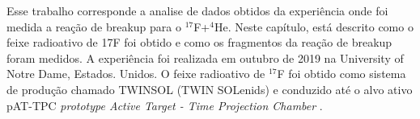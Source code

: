 \documentclass[a4paper,12pt,oneside]{book}
\begin{document}

\par Esse trabalho corresponde a analise de dados obtidos da experiência onde foi medida a reação de breakup para o $^{17}$F+$^{4}$He. Neste capítulo, está descrito como o feixe radioativo de 17F foi obtido e como os fragmentos da reação de breakup foram medidos. A experiência foi realizada em outubro de 2019 na University of Notre Dame, Estados. Unidos. O feixe radioativo de $^{17}$F foi obtido como sistema de produção chamado TWINSOL (TWIN SOLenids) \cite{twinsol} e conduzido até o alvo ativo pAT-TPC \textit{prototype Active Target - Time Projection Chamber} \cite{pattpc}.





\end{document}
